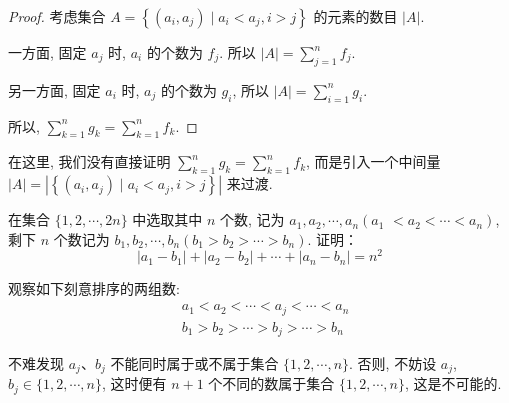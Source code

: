 \begin{proof}
	考虑集合 $A=\left\{\left(a_{i}, a_{j}\right) \mid a_{i}<a_{j}, i>j\right\}$ 的元素的数目 $|A|$.

	一方面, 固定 $a_{j}$ 时, $a_{i}$ 的个数为 $f_{j}$. 所以 $|A|=\sum_{j=1}^{n} f_{j}$.

	另一方面, 固定 $a_{i}$ 时, $a_{j}$ 的个数为 $g_{i}$, 所以 $|A|=\sum_{i=1}^{n} g_{i}$.

	所以, $\sum_{k=1}^{n} g_{k}=\sum_{k=1}^{n} f_{k}$.
\end{proof}

\begin{note}
	在这里, 我们没有直接证明 $\sum_{k=1}^{n} g_{k}=\sum_{k=1}^{n} f_{k}$, 而是引入一个中间量 $|A|=\left|\left\{\left(a_{i}, a_{j}\right) \mid a_{i}<a_{j}, i>j\right\}\right|$ 来过渡.
\end{note}

\begin{example}
	在集合 $\{1,2, \cdots, 2 n\}$ 中选取其中 $n$ 个数, 记为 $a_{1}, a_{2}, \cdots, a_{n}\left(a_{1}\right.$ $\left.<a_{2}<\cdots<a_{n}\right)$, 剩下 $n$ 个数记为 $b_{1}, b_{2}, \cdots, b_{n}\left(b_{1}>b_{2}>\cdots>b_{n}\right)$. 证明：
	$$
		\left|a_{1}-b_{1}\right|+\left|a_{2}-b_{2}\right|+\cdots+\left|a_{n}-b_{n}\right|=n^{2}
	$$
\end{example}

\begin{analysis}
	观察如下刻意排序的两组数:
	$$
		\begin{aligned}
			 & a_{1}<a_{2}<\cdots<a_{j}<\cdots<a_{n} \\
			 & b_{1}>b_{2}>\cdots>b_{j}>\cdots>b_{n}
		\end{aligned}
	$$

	不难发现 $a_{j} 、 b_{j}$ 不能同时属于或不属于集合 $\{1,2, \cdots, n\}$. 否则, 不妨设 $a_{j}$, $b_{j} \in\{1,2, \cdots, n\}$, 这时便有 $n+1$ 个不同的数属于集合 $\{1,2, \cdots, n\}$, 这是不可能的.
\end{analysis}

